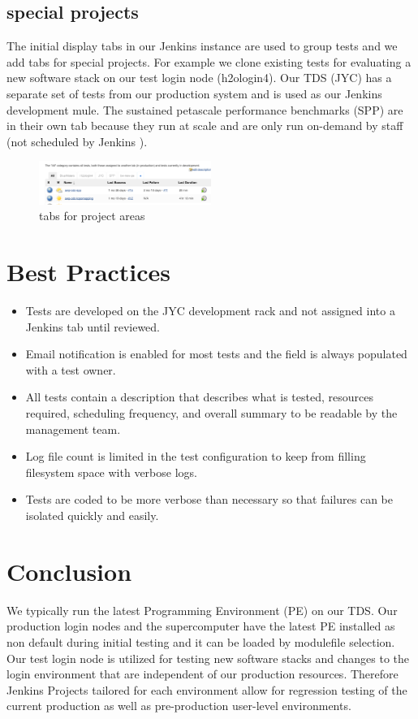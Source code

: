 \documentclass[10pt, conference, compsocconf]{IEEEtran}
\begin{document}
{\subsection{special projects}
The initial display tabs in our Jenkins instance are used to group tests and we add tabs for special projects.   For example we clone existing tests for evaluating a new software stack on our test login node (h2ologin4).   Our TDS (JYC) has a separate set of tests from our production system and is used as our Jenkins development mule.  The sustained petascale performance benchmarks (SPP) are in their own tab because they run at scale and are only run on-demand by staff (not scheduled by Jenkins ).
\begin{figure}[H]
\centering
\includegraphics[width=0.5\textwidth]{tabs-display}
\caption{ tabs for project areas }
\label{fig:tabs-display}
\end{figure}

\section{Best Practices}
\begin{itemize}
\item Tests are developed on the JYC development rack and not assigned into a Jenkins tab until reviewed. 
\item Email notification is enabled for most tests and the field is always populated with a test owner.
\item All tests contain a description that describes what is tested, resources required, scheduling frequency, and overall summary  to be readable by the management team.
\item Log file count is limited in the test configuration to keep from filling filesystem space with verbose logs.
\item Tests are coded to be more verbose than necessary so that failures can be isolated quickly and easily.
\end{itemize}

\section{Conclusion}
\label{sec:Conclusion}

We typically run the latest Programming Environment (PE) on our TDS. Our production login nodes and the supercomputer have the latest PE installed as non default during initial testing and it can be loaded by modulefile selection. Our test login node is utilized for testing new software stacks and changes to the login environment that are independent of our production resources. Therefore Jenkins Projects tailored for each environment allow for regression testing of the current production as well as pre-production user-level environments.   

}
\end{document}
